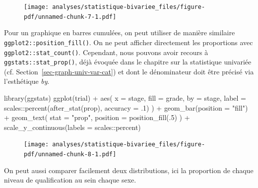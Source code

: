 \documentclass[
  letterpaper,
  DIV=11,
  numbers=noendperiod,
  oneside]{scrreprt}
\newenvironment{Shaded}{\begin{snugshade}}{\end{snugshade}}
\newcommand{\AttributeTok}[1]{\textcolor[rgb]{0.40,0.45,0.13}{#1}}
\newcommand{\DecValTok}[1]{\textcolor[rgb]{0.68,0.00,0.00}{#1}}
\newcommand{\FunctionTok}[1]{\textcolor[rgb]{0.28,0.35,0.67}{#1}}
\newcommand{\NormalTok}[1]{\textcolor[rgb]{0.00,0.23,0.31}{#1}}
\newcommand{\SpecialCharTok}[1]{\textcolor[rgb]{0.37,0.37,0.37}{#1}}
\newcommand{\StringTok}[1]{\textcolor[rgb]{0.13,0.47,0.30}{#1}}
\begin{document}
\begin{tcolorbox}
\begin{figure}[H]

{\centering \texttt{[image: analyses/statistique-bivariee\_files/figure-pdf/unnamed-chunk-7-1.pdf]}

}

\end{figure}

Pour un graphique en barres cumulées, on peut utiliser de manière
similaire \texttt{ggplot2::position\_fill()}. On ne peut afficher
directement les proportions avec \texttt{ggplot2::stat\_count()}.
Cependant, nous pouvons avoir recours à \texttt{ggstats::stat\_prop()},
déjà évoquée dans le chapitre sur la statistique univariée (cf.
Section~\ref{sec-graph-univ-var-cat}) et dont le dénominateur doit être
précisé via l'esthétique \emph{by}.

\begin{Shaded}
\begin{Highlighting}[]
\FunctionTok{library}\NormalTok{(ggstats)}
\FunctionTok{ggplot}\NormalTok{(trial) }\SpecialCharTok{+}
  \FunctionTok{aes}\NormalTok{(}
    \AttributeTok{x =}\NormalTok{ stage, }
    \AttributeTok{fill =}\NormalTok{ grade, }
    \AttributeTok{by =}\NormalTok{ stage,}
    \AttributeTok{label =}\NormalTok{ scales}\SpecialCharTok{::}\FunctionTok{percent}\NormalTok{(}\FunctionTok{after\_stat}\NormalTok{(prop), }\AttributeTok{accuracy =}\NormalTok{ .}\DecValTok{1}\NormalTok{)}
\NormalTok{  ) }\SpecialCharTok{+}
  \FunctionTok{geom\_bar}\NormalTok{(}\AttributeTok{position =} \StringTok{"fill"}\NormalTok{) }\SpecialCharTok{+}
  \FunctionTok{geom\_text}\NormalTok{(}
    \AttributeTok{stat =} \StringTok{"prop"}\NormalTok{, }
    \AttributeTok{position =} \FunctionTok{position\_fill}\NormalTok{(.}\DecValTok{5}\NormalTok{)}
\NormalTok{  ) }\SpecialCharTok{+}
  \FunctionTok{scale\_y\_continuous}\NormalTok{(}\AttributeTok{labels =}\NormalTok{ scales}\SpecialCharTok{::}\NormalTok{percent)}
\end{Highlighting}
\end{Shaded}

\begin{figure}[H]

{\centering \texttt{[image: analyses/statistique-bivariee\_files/figure-pdf/unnamed-chunk-8-1.pdf]}

}

\end{figure}

On peut aussi comparer facilement deux distributions, ici la proportion
de chaque niveau de qualification au sein chaque sexe.


\end{tcolorbox}
\end{document}
